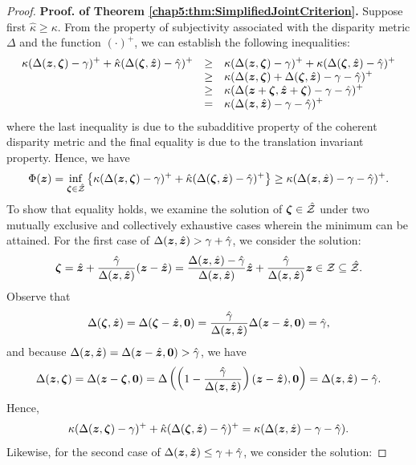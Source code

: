 \documentclass[opre, nonblindrev]{informswp}
\newcommand{\1}[1]{\mathds{1}{\left(#1\right)}}
\begin{document}
\begin{appendices}
\begin{proof}{\bf Proof. of Theorem \ref{chap5:thm:SimplifiedJointCriterion}.}
Suppose first $\hat \kappa \geq \kappa$. From the property of subjectivity associated with the disparity metric $\Delta$ and the function $(\cdot)^+$, we can establish the following inequalities:
$$
\begin{array}{rcl}
\displaystyle \kappa (  \Delta(\bm z,\bm \zeta) - \gamma)^+ + \hat \kappa ( \Delta(\bm \zeta,\hat{\bm{z}}) - \hat \gamma)^+ 
&\geq&  \displaystyle \kappa (  \Delta(\bm z,\bm \zeta) - \gamma)^+ +  \kappa ( \Delta(\bm \zeta,\hat{\bm{z}}) - \hat \gamma)^+\\
&\geq&  \displaystyle \kappa ( \Delta(\bm z,\bm \zeta) + \Delta(\bm \zeta,\hat{\bm{z}}) - \gamma - \hat \gamma)^+ \\
&\geq&  \displaystyle \kappa ( \Delta(\bm z+\bm \zeta,\hat{\bm{z}}+ \bm \zeta) - \gamma - \hat \gamma)^+ \\
&=&  \displaystyle \kappa ( \Delta(\bm{z},\hat{\bm{z}}) - \gamma - \hat \gamma)^+ 
\end{array}
$$
where the last inequality is due to the subadditive property of the coherent disparity metric and the final equality is due to the translation invariant property. Hence, we have 
$$
\Phi(\bm z) = \inf_{\bm \zeta  \in  \hat {\mathcal{Z}}} \left\{ \kappa (  \Delta(\bm z,\bm \zeta) - \gamma)^+ + \hat \kappa ( \Delta(\bm \zeta,\hat{\bm{z}}) - \hat \gamma)^+ \right\} \geq  \kappa( \Delta(\bm z,\hat{\bm{z}}) - \gamma -\hat \gamma)^+.
$$
To show that equality holds, we examine the solution of $\bm \zeta  \in  \hat {\mathcal{Z}}$ under two mutually exclusive and collectively exhaustive cases wherein the minimum can be attained. For the first case of $\Delta(\bm z,\hat{\bm{z}})> \gamma + \hat \gamma$, we consider the solution:
$$
\bm \zeta = \hat{\bm{z}} + \frac{\hat \gamma}{\Delta(\bm z,\hat{\bm{z}})}(\bm z - \hat{\bm{z}}) = \frac{\Delta(\bm z,\hat{\bm{z}}) - \hat \gamma}{\Delta(\bm z,\hat{\bm{z}})}\hat{\bm{z}} +  \frac{\hat \gamma}{\Delta(\bm z,\hat{\bm{z}})}\bm z \in \mathcal{Z} \subseteq \hat {\mathcal{Z}}. 
$$
Observe that 
$$
\Delta(\bm \zeta,\hat{\bm{z}}) = \Delta(\bm \zeta-\hat{\bm{z}},\bm 0) = \frac{\hat \gamma}{\Delta(\bm z,\hat{\bm{z}})}  \Delta(\bm z-\hat{\bm{z}},\bm 0) =  \hat \gamma,
$$
and because $\Delta(\bm z,\hat{\bm{z}})=\Delta(\bm z-\hat{\bm{z}},\bm 0)> \hat \gamma$, we have 
$$
\Delta(\bm z,\bm \zeta)= \Delta(\bm z - \bm \zeta, \bm 0) = \Delta\left( \left( 1- \frac{\hat \gamma}{\Delta(\bm z,\hat{\bm{z}})}\right)(\bm z - \hat{\bm{z}}),\bm 0\right) = \Delta(\bm z,\hat{\bm{z}}) - \hat \gamma.
$$
Hence,
$$
\kappa (  \Delta(\bm z,\bm \zeta) - \gamma)^+ + \hat \kappa ( \Delta(\bm \zeta,\hat{\bm{z}}) - \hat \gamma)^+ =  \kappa( \Delta(\bm z,\hat{\bm{z}}) - \gamma -\hat \gamma). 
$$
Likewise, for the second case of $\Delta(\bm z,\hat{\bm{z}})\leq \gamma + \hat \gamma$, we consider the solution:

\end{proof}
\end{appendices}
\end{document}
